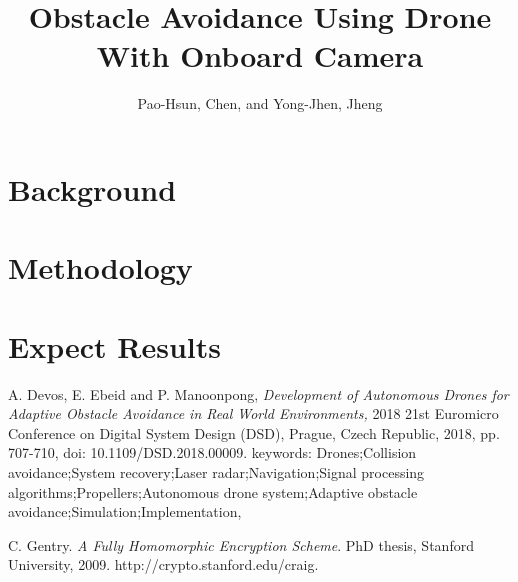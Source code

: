 \documentclass[]{article}
\title{Obstacle Avoidance Using Drone With Onboard Camera}
\author{Pao-Hsun, Chen, and Yong-Jhen, Jheng}
\begin{document}
	
	\maketitle
	
	\section{Background}
	
	\section{Methodology}
	
	\section{Expect Results}
	
	
	\begin{thebibliography}{1}
		
		A. Devos, E. Ebeid and P. Manoonpong, \emph{Development of Autonomous Drones for Adaptive Obstacle Avoidance in Real World Environments,} 2018 21st Euromicro Conference on Digital System Design (DSD), Prague, Czech Republic, 2018, pp. 707-710, doi: 10.1109/DSD.2018.00009. keywords: {Drones;Collision avoidance;System recovery;Laser radar;Navigation;Signal processing algorithms;Propellers;Autonomous drone system;Adaptive obstacle avoidance;Simulation;Implementation},
		
		
		
		C. Gentry. \emph{A Fully Homomorphic Encryption Scheme}. PhD thesis, Stanford University, 2009. http://crypto.stanford.edu/craig.
		
	\end{thebibliography}
	
\end{document}
